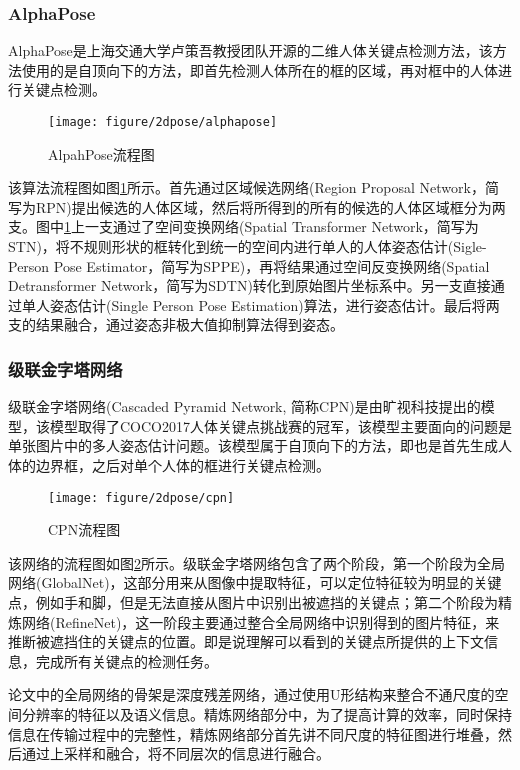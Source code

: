 \subsubsection{AlphaPose}
AlphaPose\cite{AlphaPose}是上海交通大学卢策吾教授团队开源的二维人体关键点检测方法，该方法使用的是自顶向下的方法，即首先检测人体所在的框的区域，再对框中的人体进行关键点检测。
\begin{figure}[H]
    \centering
    \texttt{[image: figure/2dpose/alphapose]}
    \caption{\label{fig:2d-ap} AlpahPose流程图}
\end{figure}
该算法流程图如图\ref{fig:2d-ap}所示。首先通过区域候选网络(Region Proposal Network，简写为RPN)提出候选的人体区域，然后将所得到的所有的候选的人体区域框分为两支。图中\ref{fig:2d-ap}上一支通过了空间变换网络(Spatial Transformer Network，简写为STN)，将不规则形状的框转化到统一的空间内进行单人的人体姿态估计(Sigle-Person Pose Estimator，简写为SPPE)，再将结果通过空间反变换网络(Spatial Detransformer Network，简写为SDTN)转化到原始图片坐标系中。另一支直接通过单人姿态估计(Single Person Pose Estimation)算法，进行姿态估计。最后将两支的结果融合，通过姿态非极大值抑制算法得到姿态。

\subsubsection{级联金字塔网络}
级联金字塔网络(Cascaded Pyramid Network, 简称CPN)\cite{CPN}是由旷视科技提出的模型，该模型取得了COCO2017人体关键点挑战赛的冠军，该模型主要面向的问题是单张图片中的多人姿态估计问题。该模型属于自顶向下的方法，即也是首先生成人体的边界框，之后对单个人体的框进行关键点检测。
\begin{figure}[H]
    \centering
    \texttt{[image: figure/2dpose/cpn]}
    \caption{\label{fig:2d-cpn} CPN流程图}
\end{figure}
该网络的流程图如图\ref{fig:2d-cpn}所示。级联金字塔网络包含了两个阶段，第一个阶段为全局网络(GlobalNet)，这部分用来从图像中提取特征，可以定位特征较为明显的关键点，例如手和脚，但是无法直接从图片中识别出被遮挡的关键点；第二个阶段为精炼网络(RefineNet)，这一阶段主要通过整合全局网络中识别得到的图片特征，来推断被遮挡住的关键点的位置。即是说理解可以看到的关键点所提供的上下文信息，完成所有关键点的检测任务。

论文中的全局网络的骨架是深度残差网络\cite{resnet}，通过使用U形结构来整合不通尺度的空间分辨率的特征以及语义信息。精炼网络部分中，为了提高计算的效率，同时保持信息在传输过程中的完整性，精炼网络部分首先讲不同尺度的特征图进行堆叠，然后通过上采样和融合，将不同层次的信息进行融合。

